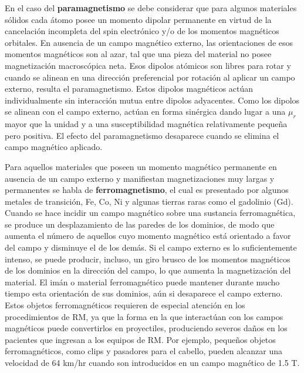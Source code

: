 En el caso del \textbf{paramagnetismo} se debe considerar que para algunos materiales sólidos cada átomo posee un momento dipolar permanente en virtud de la cancelación incompleta del spin electrónico y/o de los momentos magnéticos orbitales. En ausencia de un campo magnético externo, las orientaciones de esos momentos magnéticos son al azar, tal que una pieza del material no posee magnetización macroscópica neta. Esos dipolos atómicos son libres para rotar y cuando se alinean en una dirección preferencial por rotación al aplicar un campo externo, resulta el paramagnetismo. Estos dipolos magnéticos actúan individualmente sin interacción mutua entre dipolos adyacentes. Como los dipolos se alinean con el campo externo, actúan en forma sinérgica dando lugar a una $\mu_r$ mayor que la unidad y a una susceptibilidad magnética relativamente pequeña pero positiva. El efecto del paramagnetismo desaparece cuando se elimina el campo magnético aplicado.


Para aquellos materiales que poseen un momento magnético permanente en ausencia de un campo externo y manifiestan magnetizaciones muy largas y permanentes se habla de \textbf{ferromagnetismo}, el cual es presentado por algunos metales de transición, Fe, Co, Ni y algunas tierras raras como el gadolinio (Gd). Cuando se hace incidir un campo magnético sobre una sustancia ferromagnética, se produce un desplazamiento de las paredes de los dominios, de modo que aumenta el número de aquellos cuyo momento magnético está orientado a favor del campo y disminuye el de los demás. Si el campo externo es lo suficientemente intenso, se puede producir, incluso, un giro brusco de los momentos magnéticos de los dominios en la dirección del campo, lo que aumenta la magnetización del material. El imán o material ferromagnético puede mantener durante mucho tiempo esta orientación de sus dominios, aún si desaparece el campo externo.  Estos objetos ferromagnéticos requieren de especial atención en los procedimientos de RM, ya que la forma en la que interactúan con los campos magnéticos puede convertirlos en proyectiles, produciendo severos daños en los pacientes que ingresan a los equipos de RM. Por ejemplo, pequeños objetos ferromagnéticos, como clips y pasadores para el cabello, pueden alcanzar una velocidad de 64 km/hr cuando son introducidos en un campo magnético de 1.5 T. 

